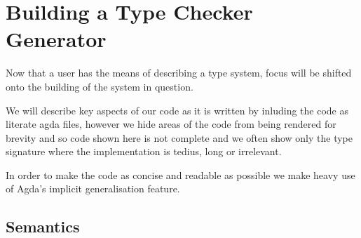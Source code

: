 \chapter{Building a Type Checker Generator}

Now that a user has the means of describing a type system, focus will
be shifted onto the building of the system in question.

We will describe key aspects of our code as it is written by inluding
the code as literate agda files, however we hide areas of the code
from being rendered for brevity and so code shown here is not
complete and we often show only the type signature where the
implementation is tedius, long or irrelevant.

In order to make the code as concise and readable as possible we make
heavy use of Agda's implicit generalisation feature.












\section{Semantics}

